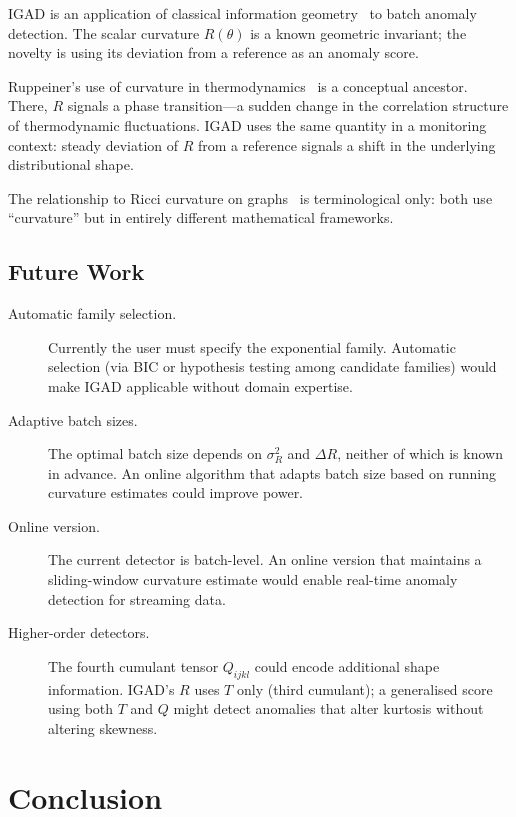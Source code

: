 \documentclass[12pt]{article}
\begin{document}
IGAD is an application of classical information geometry~\cite{amari1985,amari2000}
to batch anomaly detection. The scalar curvature $R(\theta)$ is a known geometric
invariant; the novelty is using its deviation from a reference as an anomaly score.

Ruppeiner's use of curvature in thermodynamics~\cite{ruppeiner1979,ruppeiner1995}
is a conceptual ancestor. There, $R$ signals a phase transition---a sudden change
in the correlation structure of thermodynamic fluctuations. IGAD uses the same
quantity in a monitoring context: steady deviation of $R$ from a reference
signals a shift in the underlying distributional shape.

The relationship to Ricci curvature on graphs~\cite{ollivier2009,lin2011} is
terminological only: both use ``curvature'' but in entirely different mathematical
frameworks.

\subsection{Future Work}

\begin{description}
  \item[Automatic family selection.]
    Currently the user must specify the exponential family. Automatic selection
    (via BIC or hypothesis testing among candidate families) would make IGAD
    applicable without domain expertise.
  \item[Adaptive batch sizes.]
    The optimal batch size depends on $\sigma^2_R$ and $\Delta R$, neither of
    which is known in advance. An online algorithm that adapts batch size based
    on running curvature estimates could improve power.
  \item[Online version.]
    The current detector is batch-level. An online version that maintains a
    sliding-window curvature estimate would enable real-time anomaly detection
    for streaming data.
  \item[Higher-order detectors.]
    The fourth cumulant tensor $Q_{ijkl}$ could encode additional shape
    information. IGAD's $R$ uses $T$ only (third cumulant); a generalised score
    using both $T$ and $Q$ might detect anomalies that alter kurtosis without
    altering skewness.
\end{description}

\section{Conclusion}
\end{document}
